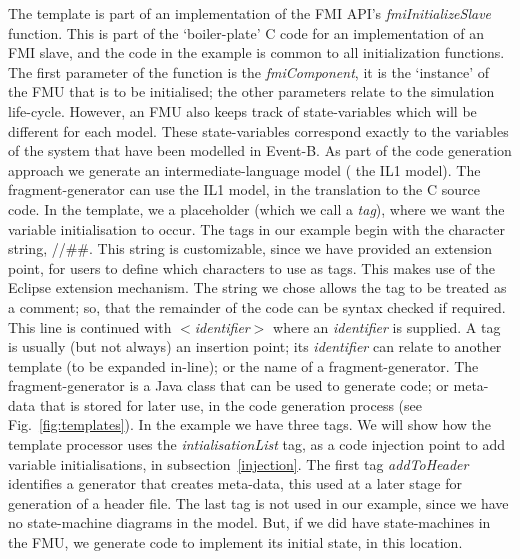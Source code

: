 \documentclass{llncs}%
\begin{document}
The template is part of an implementation of the FMI API's \emph{fmiInitializeSlave} function. This is part of the `boiler-plate' C code for an implementation of an FMI slave, and the code in the example is common to all initialization functions. The first parameter of the function is the \emph{fmiComponent}, it is the `instance' of the FMU that is to be initialised; the other parameters relate to the simulation life-cycle.  However, an FMU also keeps track of state-variables which will be different for each model. These state-variables correspond exactly to the variables of the system that have been modelled in Event-B. As part of the code generation approach we generate an intermediate-language model ( the IL1 model). The fragment-generator can use the IL1 model, in the translation to the C source code.  In the template, we a placeholder (which we call a \emph{tag}), where we want the variable initialisation to occur. The tags in our example begin with the character string, //\#\#.  This string is customizable, since we have provided an extension point, for users to define which characters to use as tags. This makes use of the Eclipse extension mechanism. The string we chose allows the tag to be treated as a comment; so, that the remainder of the code can be syntax checked if required. This line is continued with $<$\emph{identifier}$>$ where an \emph{identifier} is supplied. A tag is usually (but not always) an insertion point; its \emph{identifier} can relate to another template (to be expanded in-line); or the name of a fragment-generator. The fragment-generator is a Java class that can be used to generate code; or meta-data that is stored for later use, in the code generation process  (see Fig.~\ref{fig:templates}). In the example we have three tags. We will show how the template processor uses the \emph{intialisationList} tag, as a code injection point to add variable initialisations, in subsection~\ref{injection}. The first tag \emph{addToHeader} identifies a generator that creates meta-data, this used at a later stage for generation of a header file. The last tag is not used in our example, since we have no state-machine diagrams in the model. But, if we did have state-machines in the FMU, we generate code to implement its initial state, in this location.
%
\end{document}

